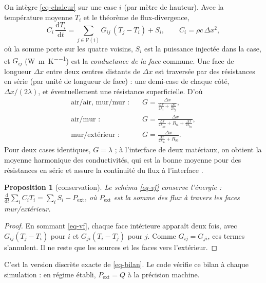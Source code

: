 \documentclass[11pt,a4paper]{article}
\newtheorem{proposition}{Proposition}
\theoremstyle{definition}
\theoremstyle{remark}
\newcommand{\dx}{\Delta x}
\newcommand{\Rsi}{R_{\mathrm{si}}}
\newcommand{\Rse}{R_{\mathrm{se}}}
\newcommand{\la}{\lambda_{\mathrm{air}}}
\newcommand{\lm}{\lambda_{\mathrm{m}}}
\begin{document}
On intègre \eqref{eq-chaleur} sur une case $i$ (par mètre de hauteur). Avec la
température moyenne $T_i$ et le théorème de flux-divergence,
\begin{equation}\label{eq-vf}
C_i\,\frac{\mathrm{d}T_i}{\mathrm{d}t} = \sum_{j\in\mathcal{V}(i)} G_{ij}\,(T_j - T_i) + S_i,
\qquad C_i = \rho c\,\dx^2,
\end{equation}
où la somme porte sur les quatre voisins, $S_i$ est la puissance injectée dans la
case, et $G_{ij}$ (\unit{\watt\per\metre\per\kelvin}) est la \emph{conductance de la
face} commune. Une face de longueur $\dx$ entre deux centres distants de $\dx$ est
traversée par des résistances en série (par unité de longueur de face) : une
demi-case de chaque côté, $\dx/(2\lambda)$, et éventuellement une résistance
superficielle. D'où
\begin{equation}\label{eq-conductances}
\begin{aligned}
\text{air/air, mur/mur :}\quad & G = \frac{\dx}{\frac{\dx}{2\lambda_i}+\frac{\dx}{2\lambda_j}},\\
\text{air/mur :}\quad & G = \frac{\dx}{\frac{\dx}{2\la}+\Rsi+\frac{\dx}{2\lm}},\\
\text{mur/extérieur :}\quad & G = \frac{\dx}{\frac{\dx}{2\lm}+\Rse}.
\end{aligned}
\end{equation}
Pour deux cases identiques, $G=\lambda$ ; à l'interface de deux matériaux, on
obtient la moyenne harmonique des conductivités, qui est la bonne moyenne pour des
résistances en série et assure la continuité du flux à l'interface
\cite{patankar1980}.

\begin{proposition}[conservation]
Le schéma \eqref{eq-vf} conserve l'énergie : $\frac{\mathrm{d}}{\mathrm{d}t}\sum_i C_iT_i
= \sum_i S_i - P_{\mathrm{ext}}$, où $P_{\mathrm{ext}}$ est la somme des flux à
travers les faces mur/extérieur.
\end{proposition}

\begin{proof}
En sommant \eqref{eq-vf}, chaque face intérieure apparaît deux fois, avec
$G_{ij}(T_j-T_i)$ pour $i$ et $G_{ji}(T_i-T_j)$ pour $j$. Comme $G_{ij}=G_{ji}$,
ces termes s'annulent. Il ne reste que les sources et les faces vers l'extérieur.
\end{proof}

C'est la version discrète exacte de \eqref{eq-bilan}. Le code vérifie ce bilan à
chaque simulation : en régime établi, $P_{\mathrm{ext}} = Q$ à la précision machine.
\end{document}
